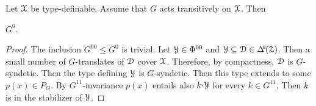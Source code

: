 \begin{proposition}
  Let $\EuScript X$ be type-definable.
  Assume that $G$ acts transitively on $\EuScript X$.
  Then 
  
  \medrel{\leq}$G^0$.
\end{proposition}

\begin{proof}
  The inclusion $G^{00}\leq G^0$ is trivial.
  Let $\EuScript Y\in\Phi^{00}$ and $\Y\subseteq\D\in\BDelta(\Z)$.
  Then a small number of $G$-translates of $\EuScript D$ cover $\EuScript X$.
  Therefore, by compactness, $\EuScript D$ is $G$-syndetic.
  Then the type defining $\EuScript Y$ is $G$-syndetic.
  Then this type extends to some $p(x)\in P_G$.
  By $G^{1\!1}$-invariance $p(x)$ entails also $k{\cdot}\EuScript Y$ for every $k\in G^{1\!1}$.
  Then $k$ is in the stabilizer of $\EuScript Y$.
\end{proof}

